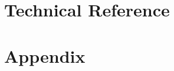 \documentclass[12pt,oneside, onecolumn,a4paper]{pharmmlspec}
\begin{document}










%














\part{Technical Reference}
\label{part:techref}






\appendix

\part{Appendix}



\backmatter


\end{document}
